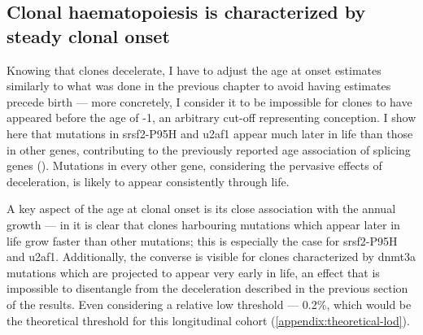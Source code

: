 \begin{figure}[!ht]
	\label{fig:historical-growth-representation}
\end{figure}

\begin{figure}[!ht]
	\label{fig:deceleration-figure-full}
\end{figure}

\begin{figure}[!ht]
	\label{fig:historical-growth-tally}
\end{figure}

\subsection{Clonal haematopoiesis is characterized by steady clonal onset}

Knowing that clones decelerate, I have to adjust the age at onset estimates similarly to what was done in the previous chapter to avoid having estimates precede birth --- more concretely, I consider it to be impossible for clones to have appeared before the age of -1, an arbitrary cut-off representing conception. I show here that mutations in \ac{srsf2}-P95H and \ac{u2af1} appear much later in life than those in other genes, contributing to the previously reported age association of splicing genes \cite{McKerrell2015-rl} (). Mutations in every other gene, considering the pervasive effects of deceleration, is likely to appear consistently through life.

\begin{figure}[!ht]
	\label{fig:ages-at-onset}
\end{figure}

A key aspect of the age at clonal onset is its close association with the annual growth --- in  it is clear that clones harbouring mutations which appear later in life grow faster than other mutations; this is especially the case for \ac{srsf2}-P95H and \ac{u2af1}. Additionally, the converse is visible for clones characterized by \ac{dnmt3a} mutations which are projected to appear very early in life, an effect that is impossible to disentangle from the deceleration described in the previous section of the results. Even considering a relative low threshold --- 0.2\%, which would be the theoretical threshold for this longitudinal cohort (\autoref{appendix:theoretical-lod}).

